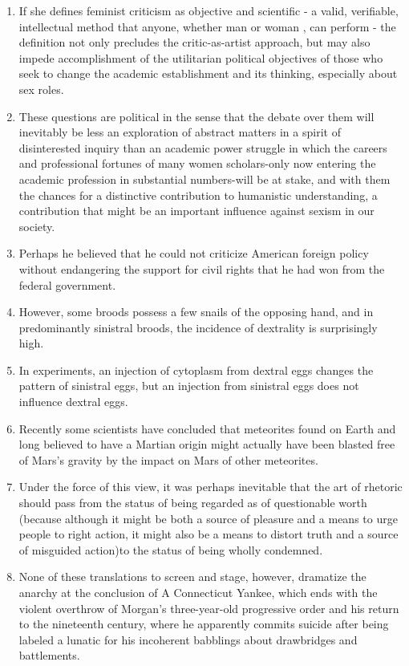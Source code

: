 \begin{enumerate}
\item If she defines feminist criticism as objective and scientific - a valid, verifiable, intellectual method that anyone, whether man or woman , can perform - the definition not only precludes the critic-as-artist approach, but may also impede accomplishment of the utilitarian political objectives of those who seek to change the academic establishment and its thinking, especially about sex roles.

\item These questions are political in the sense that the debate over them will inevitably be less an exploration of abstract matters in a spirit of disinterested inquiry than an academic power struggle in which the careers and professional fortunes of many women scholars-only now entering the academic profession in substantial numbers-will be at stake, and with them the chances for a distinctive contribution to humanistic understanding, a contribution that might be an important influence against sexism in our society. 

\item Perhaps he believed that he could not criticize American foreign policy
without endangering the support for civil rights that he had won from the federal government.

\item However, some broods possess a few snails of the opposing hand, and in
predominantly sinistral broods, the incidence of dextrality is surprisingly high.

\item In experiments, an injection of cytoplasm from dextral eggs changes the
pattern of sinistral eggs, but an injection from sinistral eggs does not influence dextral eggs. 

\item Recently some scientists have concluded that meteorites found on Earth
and long believed to have a Martian origin might actually have been blasted free of Mars's gravity by the impact on  Mars of other meteorites. 

\item Under the force of this view, it was perhaps inevitable that the art of rhetoric should pass from the status of being regarded as of questionable worth (because although it might be both a source of pleasure and a means to urge people to right action, it might also be a means to distort truth and a source of misguided action)to the status of being wholly
condemned.

\item None of these translations to screen and stage, however, dramatize the
anarchy at the  conclusion of A Connecticut Yankee, which ends with the violent overthrow of Morgan's three-year-old progressive order and his return to the nineteenth century, where he apparently commits suicide after being labeled a lunatic for his incoherent babblings about drawbridges and battlements.


\end{enumerate}
